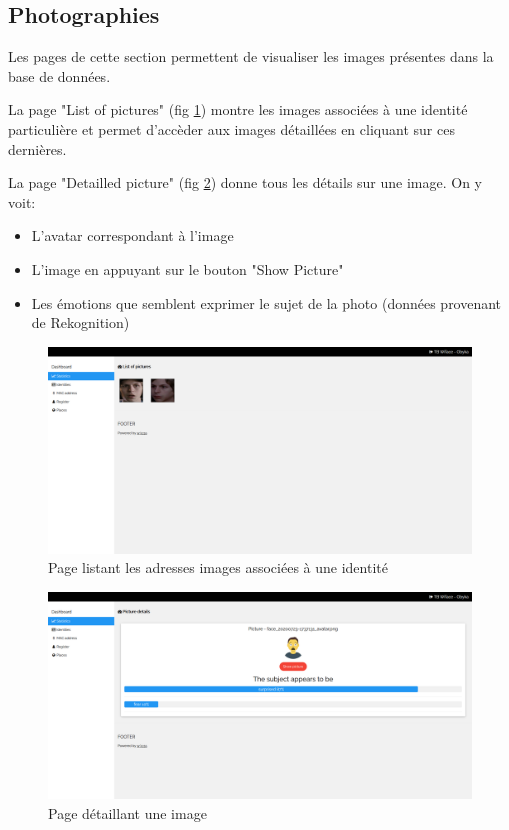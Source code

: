 \subsection{Photographies}
Les pages de cette section permettent de visualiser les images présentes dans la base de données.

La page "List of pictures" (fig \ref{fig:dashboard_list_pictures}) montre les images associées à une identité particulière et 
permet d'accèder aux images détaillées en cliquant sur ces dernières.

La page "Detailled picture" (fig \ref{fig:dashboard_picture}) donne tous les détails sur une image. On y voit:
\begin{itemize}
    \item L'avatar correspondant à l'image
    \item L'image en appuyant sur le bouton "Show Picture"
    \item Les émotions que semblent exprimer le sujet de la photo (données provenant de Rekognition)
\end{itemize}

\clearpage
\newpage
\thispagestyle{empty}
\begin{landscape}
    \centering
\thispagestyle{empty}
\begin{figure}[H]
	\includegraphics[width=0.95\linewidth]{images/dashboard/pictures.png}
	\caption{Page listant les adresses images associées à une identité}
	\label{fig:dashboard_list_pictures}
\end{figure}
\end{landscape}

\clearpage
\newpage
\thispagestyle{empty}
\begin{landscape}
    \centering
\thispagestyle{empty}
\begin{figure}[H]
	\includegraphics[width=0.95\linewidth]{images/dashboard/detailled_pictures.png}
	\caption{Page détaillant une image}
	\label{fig:dashboard_picture}
\end{figure}
\end{landscape}

